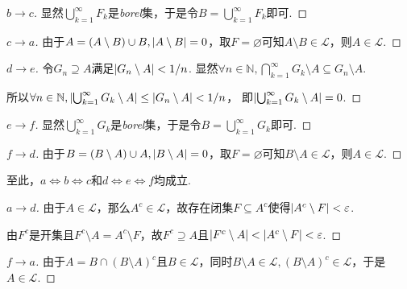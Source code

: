 \begin{proof}[\(b \to c\)]
    显然\(\bigcup_{k=1}^\infty F_k\)是\textit{borel}集，于是令\(B=\bigcup_{k=1}^\infty F_k\)即可.
\end{proof}

\begin{proof}[\(c \to a\)]
    由于\(A=(A \setminus B) \cup B, \abs*{A \setminus B}=0\)，取\(F=\varnothing\)可知\(A \setminus B \in \mathcal{L}\)，则\(A \in \mathcal{L}\).
\end{proof}

\begin{proof}[\(d \to e\)]
    令\(G_n \supseteq A\)满足\(\abs*{G_n \setminus A}<1/n\).
    显然\(\forall n \in \mathbb{N}, \bigcap_{k=1}^\infty G_k \setminus A \subseteq G_n \setminus A\).

    所以\(\forall n \in \mathbb{N}, \abs*{\bigcup_{k=1}^\infty G_k \setminus A} \leq \abs*{G_n \setminus A}<1/n\)，
    即\(\abs*{\bigcup_{k=1}^\infty G_k \setminus A}=0\).
\end{proof}

\begin{proof}[\(e \to f\)]
    显然\(\bigcup_{k=1}^\infty G_k\)是\textit{borel}集，于是令\(B=\bigcup_{k=1}^\infty G_k\)即可.
\end{proof}

\begin{proof}[\(f \to d\)]
    由于\(B=(B \setminus A) \cup A, \abs*{B \setminus A}=0\)，取\(F=\varnothing\)可知\(B \setminus A \in \mathcal{L}\)，则\(A \in \mathcal{L}\).
\end{proof}

{\kaishu 至此，\(a \Leftrightarrow b \Leftrightarrow c\)和\(d \Leftrightarrow e \Leftrightarrow f\)均成立}.

\begin{proof}[\(a \to d\)]
    由于\(A \in \mathcal{L}\)，那么\(A^c \in \mathcal{L}\)，故存在闭集\(F \subseteq A^c\)使得\(\abs*{A^c \setminus F}<\varepsilon\).

    由\(F^c\)是开集且\(F^c \setminus A=A^c \setminus F\)，故\(F^c \supseteq A\)且\(\abs*{F^c \setminus A}<\abs*{A^c \setminus F}<\varepsilon\).
\end{proof}

\begin{proof}[\(f \to a\)]
    由于\(A=B \cap (B \setminus A)^c\)且\(B \in \mathcal{L}\)，同时\(B \setminus A \in \mathcal{L}, (B \setminus A)^c \in \mathcal{L}\)，于是\(A \in \mathcal{L}\).
\end{proof}

